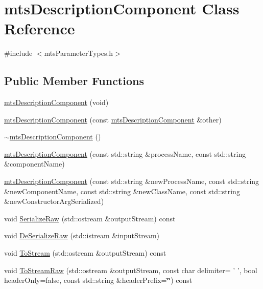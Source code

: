 \hypertarget{classmts_description_component}{\section{mts\-Description\-Component Class Reference}
\label{classmts_description_component}
}


{\ttfamily \#include $<$mts\-Parameter\-Types.\-h$>$}

\subsection*{Public Member Functions}
\begin{DoxyCompactItemize}
\item 
\hyperlink{classmts_description_component_abb1d2b4587f2b86f2070cd7d33a1fc57}{mts\-Description\-Component} (void)
\item 
\hyperlink{classmts_description_component_a15d1c237d2196cf573ce442e8ae0a597}{mts\-Description\-Component} (const \hyperlink{classmts_description_component}{mts\-Description\-Component} \&other)
\item 
\hyperlink{classmts_description_component_a891c37198cf46584c198becb27b372b9}{$\sim$mts\-Description\-Component} ()
\item 
\hyperlink{classmts_description_component_a022a329285ff0c793a588f0014373fdc}{mts\-Description\-Component} (const std\-::string \&process\-Name, const std\-::string \&component\-Name)
\item 
\hyperlink{classmts_description_component_a39f4b74c0f93187fbe8b0734eef66c01}{mts\-Description\-Component} (const std\-::string \&new\-Process\-Name, const std\-::string \&new\-Component\-Name, const std\-::string \&new\-Class\-Name, const std\-::string \&new\-Constructor\-Arg\-Serialized)
\item 
void \hyperlink{classmts_description_component_a09652ed1727c796942e2e57f8d1ab7d8}{Serialize\-Raw} (std\-::ostream \&output\-Stream) const 
\item 
void \hyperlink{classmts_description_component_a2d70966716f802b6125a997ffb80c6c1}{De\-Serialize\-Raw} (std\-::istream \&input\-Stream)
\item 
void \hyperlink{classmts_description_component_a5b044244aad1b5530e21aac0c6264bc0}{To\-Stream} (std\-::ostream \&output\-Stream) const 
\item 
void \hyperlink{classmts_description_component_ada4ea3aa4d0ac18d94f5f8dd4d4dc701}{To\-Stream\-Raw} (std\-::ostream \&output\-Stream, const char delimiter= ' ', bool header\-Only=false, const std\-::string \&header\-Prefix=\char`\"{}\char`\"{}) const 

\end{DoxyCompactItemize}
